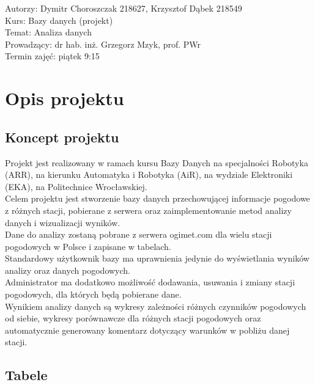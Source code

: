 \documentclass[12pt,a4paper]{article}
\begin{document}
\vspace{20pt}
 
\flushleft Autorzy: Dymitr Choroszczak 218627, Krzysztof Dąbek 218549\\
Kurs: Bazy danych (projekt)\\
Temat: Analiza danych\\
Prowadzący: dr hab. inż. Grzegorz Mzyk, prof. PWr\\
Termin zajęć: piątek 9:15\\
 
 
\newpage
 
\tableofcontents
 
\newpage
 
\section{Opis projektu}
 
\subsection{Koncept projektu}
\normalsize
Projekt jest realizowany w ramach kursu Bazy Danych na specjalności Robotyka (ARR), na kierunku Automatyka i Robotyka (AiR), na wydziale Elektroniki (EKA), na Politechnice Wrocławskiej.\\
Celem projektu jest stworzenie bazy danych przechowującej informacje pogodowe z różnych stacji, pobierane z serwera oraz zaimplementowanie metod analizy danych i wizualizacji wyników.\\
Dane do analizy zostaną pobrane z serwera ogimet.com dla wielu stacji pogodowych w Polsce i zapisane w tabelach.\\
Standardowy użytkownik bazy ma uprawnienia jedynie do wyświetlania wyników analizy oraz danych pogodowych.\\
Administrator ma dodatkowo możliwość dodawania, usuwania i zmiany stacji pogodowych, dla których będą pobierane dane.\\
Wynikiem analizy danych są wykresy zależności różnych czynników pogodowych od siebie, wykresy porównawcze dla różnych stacji pogodowych oraz automatycznie generowany komentarz dotyczący warunków w pobliżu danej stacji.
 
\subsection{Tabele}
\end{document}
